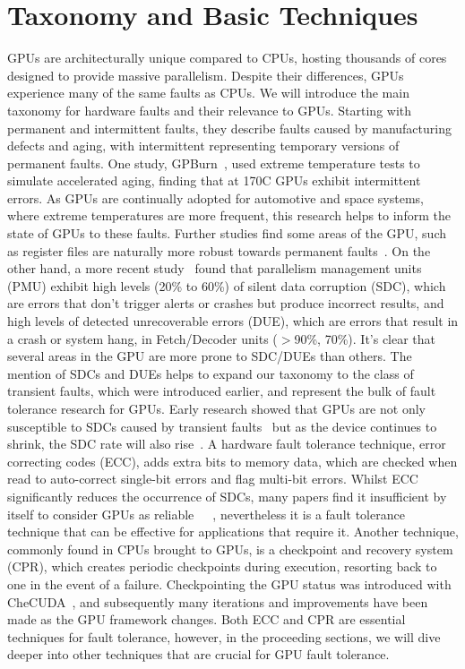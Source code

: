 \documentclass{article}
\begin{document}
\section{Taxonomy and Basic Techniques}
GPUs are architecturally unique compared to CPUs, hosting thousands of cores designed to provide massive parallelism. Despite their differences, GPUs experience many of the same faults as CPUs. We will introduce the main taxonomy for hardware faults and their relevance to GPUs. Starting with permanent and intermittent faults, they describe faults caused by manufacturing defects and aging, with intermittent representing temporary versions of permanent faults. One study, GPBurn~\cite{6621133}, used extreme temperature tests to simulate accelerated aging, finding that at 170\textdegree C GPUs exhibit intermittent errors. As GPUs are continually adopted for automotive and space systems, where extreme temperatures are more frequent, this research helps to inform the state of GPUs to these faults. Further studies find some areas of the GPU, such as register files are naturally more robust towards permanent faults~\cite{6604089}. On the other hand, a more recent study~\cite{10.1145/3581784.3607086} found that parallelism management units (PMU) exhibit high levels (20\% to 60\%) of silent data corruption (SDC), which are errors that don't trigger alerts or crashes but produce incorrect results, and high levels of detected unrecoverable errors (DUE), which are errors that result in a crash or system hang, in Fetch/Decoder units ($>$90\%, 70\%). It's clear that several areas in the GPU are more prone to SDC/DUEs than others. The mention of SDCs and DUEs helps to expand our taxonomy to the class of transient faults, which were introduced earlier, and represent the bulk of fault tolerance research for GPUs. Early research showed that GPUs are not only susceptible to SDCs caused by transient faults~\cite{5493404} but as the device continues to shrink, the SDC rate will also rise~\cite{10.1145/1736020.1736063}. A hardware fault tolerance technique, error correcting codes (ECC), adds extra bits to memory data, which are checked when read to auto-correct single-bit errors and flag multi-bit errors. Whilst ECC significantly reduces the occurrence of SDCs, many papers find it insufficient by itself to consider GPUs as reliable~\cite{6962085}~\cite{7056044}~\cite{7975296}, nevertheless it is a fault tolerance technique that can be effective for applications that require it. Another technique, commonly found in CPUs brought to GPUs, is a checkpoint and recovery system (CPR), which creates periodic checkpoints during execution, resorting back to one in the event of a failure. Checkpointing the GPU status was introduced with CheCUDA~\cite{5372771}, and subsequently many iterations and improvements have been made as the GPU framework changes. Both ECC and CPR are essential techniques for fault tolerance, however, in the proceeding sections, we will dive deeper into other techniques that are crucial for GPU fault tolerance.
\end{document}
